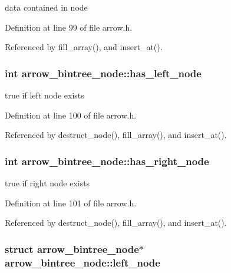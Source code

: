 data contained in node 

Definition at line 99 of file arrow.h.

Referenced by fill\_\-array(), and insert\_\-at().\hypertarget{structarrow__bintree__node_a359d3d029023fb8763af3329207ee53}{
\subsubsection{\setlength{\rightskip}{0pt plus 5cm}int {\bf arrow\_\-bintree\_\-node::has\_\-left\_\-node}}}
\label{structarrow__bintree__node_a359d3d029023fb8763af3329207ee53}


true if left node exists 

Definition at line 100 of file arrow.h.

Referenced by destruct\_\-node(), fill\_\-array(), and insert\_\-at().\hypertarget{structarrow__bintree__node_f6f8bb35c520a88841a810777e9bc186}{
\subsubsection{\setlength{\rightskip}{0pt plus 5cm}int {\bf arrow\_\-bintree\_\-node::has\_\-right\_\-node}}}
\label{structarrow__bintree__node_f6f8bb35c520a88841a810777e9bc186}


true if right node exists 

Definition at line 101 of file arrow.h.

Referenced by destruct\_\-node(), fill\_\-array(), and insert\_\-at().\hypertarget{structarrow__bintree__node_e7eb125cad02704a57796b16c49b2983}{
\subsubsection{\setlength{\rightskip}{0pt plus 5cm}struct {\bf arrow\_\-bintree\_\-node}$\ast$ {\bf arrow\_\-bintree\_\-node::left\_\-node}}}
\label{structarrow__bintree__node_e7eb125cad02704a57796b16c49b2983}


